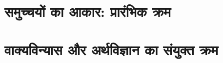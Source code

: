 \section{समुच्चयों का आकार: प्रारंभिक क्रम}
\begingroup
\RenewDocumentCommand{}
\RenewDocumentCommand{}
\RenewDocumentCommand{}
\def\OLEndChapterHook{}\def\OLEndPartHook{}

\endgroup
\section{वाक्यविन्यास और अर्थविज्ञान का संयुक्त क्रम}
\begingroup
\RenewDocumentCommand{}
\RenewDocumentCommand{}
\RenewDocumentCommand{}
\def\OLEndChapterHook{}\def\OLEndPartHook{}

\endgroup
